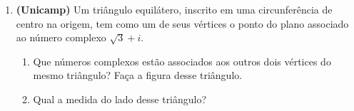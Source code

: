 \documentclass[12pt,a4paper]{article}
\begin{document}
\begin{enumerate}[label=\textbf{\arabic*.}, leftmargin=*, itemsep=1.2em]
    \item \textbf{(Unicamp)} Um triângulo equilátero, inscrito em uma circunferência de centro na origem, tem como um de seus vértices o ponto do plano associado ao número complexo $\sqrt{3} + i$.
    \begin{enumerate}[label=\alph*)]
        \item Que números complexos estão associados aos outros dois vértices do mesmo triângulo? Faça a figura desse triângulo.
        \item Qual a medida do lado desse triângulo?
    \end{enumerate}

\end{enumerate}
\end{document}
